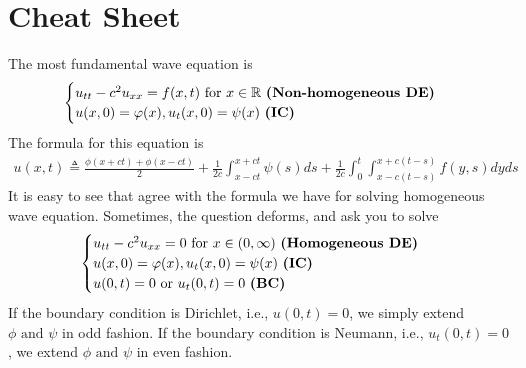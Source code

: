 \documentclass{report}
\begin{document}
\section{Cheat Sheet}
\begin{mdframed}
The most fundamental wave equation is 
\begin{align*}
\begin{cases}
  u_{tt}-c^2u_{xx}=f(x,t)\text{ for }x\inr\text{ \textbf{(Non-homogeneous DE)} } \\
  u(x,0)=\phi (x),u_t(x,0)=\psi (x)\text{ \textbf{(IC)} }
\end{cases}
\end{align*}
The formula for this equation is 
\begin{align}
\label{wavee}
u(x,t)\triangleq \frac{\phi (x+ct)+\phi (x-ct)}{2}+ \frac{1}{2c}\int^{x+ct}_{x-ct}\psi (s)ds+ \frac{1}{2c}\int_0^t \int^{x+c(t-s)}_{x-c(t-s)}f(y,s)dyds
\end{align}
It is easy to see that  agree with the formula we have for solving homogeneous wave equation. Sometimes, the question deforms, and ask you to solve  
\begin{align*}
\begin{cases}
  u_{tt}-c^2u_{xx}=0\text{ for }x\in (0,\infty)\text{ \textbf{(Homogeneous DE)} }\\
  u(x,0)=\phi (x),u_t(x,0)=\psi (x)\text{  \textbf{(IC)} }\\
  u(0,t)=0\text{ or }u_t(0,t)=0\text{ \textbf{(BC)} }
\end{cases}
\end{align*}
If the boundary condition is Dirichlet, i.e., $u(0,t)=0$, we simply extend $\phi\text{ and }\psi$ in odd fashion. If the boundary condition is Neumann, i.e., $u_t(0,t)=0$, we extend $\phi\text{ and }\psi$ in even fashion. 
\end{mdframed}
\end{document}

